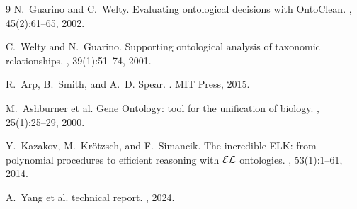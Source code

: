 \documentclass[10pt,a4paper]{article}
\begin{document}
\renewcommand{\refname}{\vspace{-0.4em}\normalsize References\vspace{-0.4em}}
\footnotesize
\begin{thebibliography}{9}
\setlength{\itemsep}{1pt}\setlength{\parsep}{0pt}
N.~Guarino and C.~Welty.
\newblock Evaluating ontological decisions with OntoClean.
, 45(2):61--65, 2002.

C.~Welty and N.~Guarino.
\newblock Supporting ontological analysis of taxonomic relationships.
, 39(1):51--74, 2001.

R.~Arp, B.~Smith, and A.~D. Spear.
.
\newblock MIT Press, 2015.

M.~Ashburner et al.
\newblock Gene Ontology: tool for the unification of biology.
, 25(1):25--29, 2000.

Y.~Kazakov, M.~Kr\"otzsch, and F.~Simancik.
\newblock The incredible ELK: from polynomial procedures to efficient
  reasoning with ${\cal EL}$ ontologies.
, 53(1):1--61, 2014.

A.~Yang et al.
 technical report.
, 2024.
\end{thebibliography}
\end{document}
